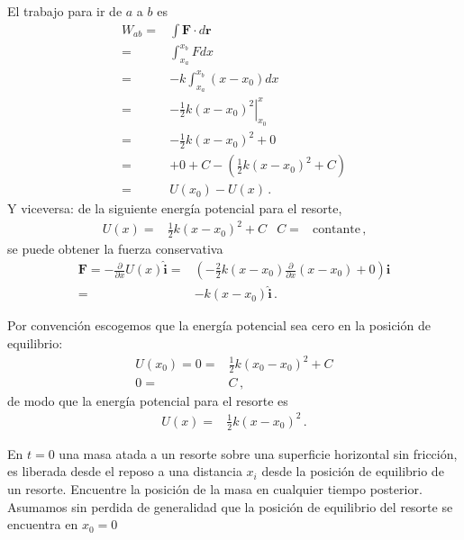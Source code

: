El trabajo para ir de $a$ a $b$ es
\begin{align}
  W_{ab}=&\int \mathbf{F}\cdot d\mathbf{r}\nonumber\\
  =&\int_{x_a}^{x_b} Fdx\nonumber\\
  =&-k\int_{x_a}^{x_b} (x-x_0)dx\nonumber\\
  =&-\tfrac{1}{2}k \left.
    (x-x_0)^2\right|_{x_0}^x\nonumber\\
  =&-\tfrac{1}{2}k (x-x_0)^2+0\nonumber\\
  =&+0+C-(\tfrac{1}{2}k (x-x_0)^2+C)\nonumber\\
  =&U(x_0)-U(x)\,.
\end{align}
Y viceversa: de la siguiente energía potencial para el resorte,
\begin{align}
  U(x)=&\tfrac{1}{2}k{(x-x_0)^2}+C& C=&\text{contante}\,,
\end{align}
se puede obtener la fuerza conservativa
\begin{align}
  \mathbf{F}=-\frac{\partial}{\partial x}U(x)\hat{\mathbf{i}}
=&\left(
-\frac{2}{2}k(x-x_0)\frac{\partial}{\partial x}(x-x_0)+0
\right)\hat{\mathbf{i}}\nonumber\\
=&-k(x-x_0)\hat{\mathbf{i}}\,.
\end{align}

Por convención escogemos que la energía potencial sea cero en la posición de equilibrio:
\begin{align}
  U(x_0)=0=&\tfrac{1}{2}k{(x_0-x_0)^2}+C\nonumber\\
  0=&C\,,
\end{align}
de modo que la energía potencial para el resorte es
\begin{align}
  U(x)=&\tfrac{1}{2}k{(x-x_0)^2}\,.
\end{align}

\ejemplo{}
\label{ex:resorte}

En $t=0$ una masa atada a un resorte sobre
una superficie horizontal sin fricción, es
liberada desde el reposo a una distancia $x_i$ desde la posición de
equilibrio de un resorte. Encuentre la posición de la masa en
  cualquier tiempo posterior. Asumamos sin perdida de generalidad que
  la posición de equilibrio del resorte se encuentra en $x_0=0$


